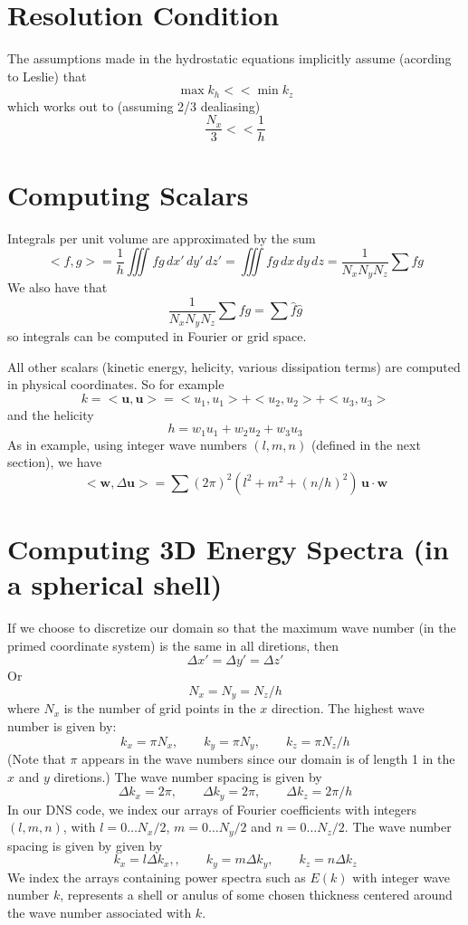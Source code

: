 \documentclass[12pt]{article}
\newcommand{\uv}{\mathbf u}
\newcommand{\omegav}{\mathbf w}
\begin{document}
\section{Resolution Condition}

The assumptions made in the hydrostatic equations implicitly assume
(acording to Leslie) that 
\[
 \max{ k_h } << \min{k_z}
\]
which works out to (assuming 2/3 dealiasing)
\[
   \frac{N_x}{3} <<  \frac{1}{h}
\]



\section{Computing Scalars}
Integrals per unit volume are approximated by the sum
\[
<f,g> = \frac{1}{h} \iiint  f g  \, dx' \, dy' \, dz' =   \iiint  f g \, dx \, dy \, dz
=\frac{1}{N_x N_y N_z} \sum  f  g
\]
We also have that 
\[
\frac{1}{N_x N_y N_z} \sum  f  g = \sum \hat{f} \hat{g}
\]
so integrals can be computed in Fourier or grid space. 

All other scalars (kinetic energy, helicity, various dissipation
terms) are computed in physical coordinates.  So for example
\[
k = <\uv,\uv> = <u_1,u_1> + <u_2,u_2> +  <u_3,u_3>
\]
and the helicity 
\[
  h  = w_1 u_1  + w_2 u_2 + w_3 u_3
\]
As in example, using integer wave numbers $(l,m,n)$ (defined in the
next section), we have
\[
< \omegav , \Delta \uv> = \sum (2 \pi)^2 (l^2 + m^2 + (n/h)^2) 
\, \uv \cdot \omegav
\]





\section{Computing 3D Energy Spectra (in a spherical shell)}
If we choose to discretize our domain so that the 
maximum wave number (in the primed coordinate system) is
the same in all diretions, then
\[
\Delta x' = \Delta y' = \Delta z'
\]
Or
\[
N_x  = N_y = N_z/h
\]
where $N_x$ is the number of grid points in the $x$ direction.
The highest wave number is given by:
\[
k_x = \pi N_x, \qquad k_y = \pi N_y, \qquad k_z = \pi N_z/h 
\]
(Note that $\pi$ appears in the wave numbers since our domain is
of length 1 in the $x$ and $y$ diretions.)  The wave number spacing
is given by
\[
\Delta k_x = 2 \pi, \qquad  \Delta k_y = 2 \pi, \qquad  \Delta k_z = 2 \pi / h 
\]
In our DNS code, we index our arrays of Fourier coefficients
with integers $(l,m,n)$, with $l=0 \dots N_x/2$, 
$m=0 \dots N_y/2$ and 
$n=0 \dots N_z/2$.  The wave number spacing is given by
given by
\[
k_x = l \Delta k_x,, \qquad  k_y = m \Delta k_y, \qquad  k_z = n  \Delta k_z
\]
We index the arrays containing power spectra
such as $E(k)$ with integer wave number $k$, represents a shell or anulus
of some chosen thickness centered around the wave number associated
with $k$.
\end{document}
